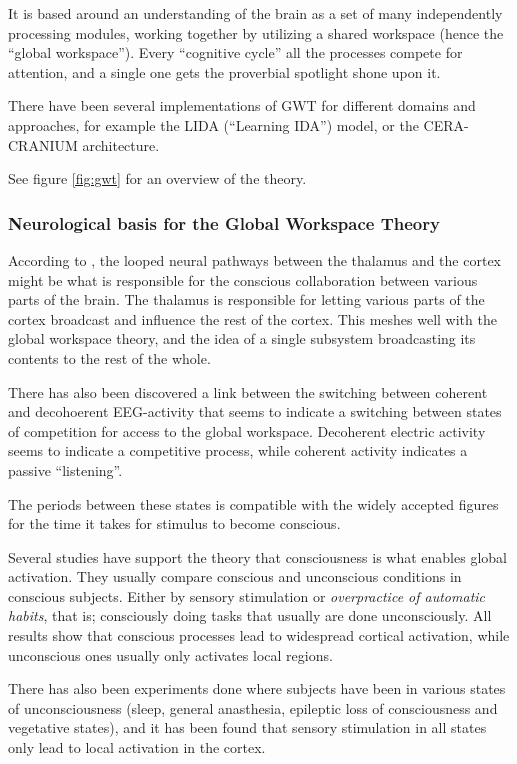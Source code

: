 It is based around an understanding of the brain as a set of many independently processing modules, working together by utilizing a shared workspace (hence the ``global workspace''). Every ``cognitive cycle'' all the processes compete for attention, and a single one gets the proverbial spotlight shone upon it.\cite{baars2005gwt}

There have been several implementations of GWT for different domains and approaches, for example the LIDA (``Learning IDA'') model\cite{franklin2007lida}, or the CERA-CRANIUM architecture\cite{arrabales2009ceracranium}.

See figure \ref{fig:gwt} for an overview of the theory.

\subsubsection{Neurological basis for the Global Workspace Theory}
According to \cite{llinas1998neuronal}, the looped neural pathways between the thalamus and the cortex might be what is responsible for the conscious collaboration between various parts of the brain. The thalamus is responsible for letting various parts of the cortex broadcast and influence the rest of the cortex. This meshes well with the global workspace theory, and the idea of a single subsystem broadcasting its contents to the rest of the whole.

There has also been discovered a link between the switching between coherent and decohoerent EEG-activity that seems to indicate a switching between states of competition for access to the global workspace. Decoherent electric activity seems to indicate a competitive process, while coherent activity indicates a passive ``listening''.\cite{freeman2003neurobiological}

The periods between these states is compatible with the widely accepted figures for the time it takes for stimulus to become conscious.\cite{shanahan2005applying}

Several studies have support the theory that consciousness is what enables global activation. They usually compare conscious and unconscious conditions in conscious subjects. Either by sensory stimulation or {\em overpractice of automatic habits}, that is; consciously doing tasks that usually are done unconsciously. All results show that conscious processes lead to widespread cortical activation, while unconscious ones usually only activates local regions.\cite{baars2003brain}

There has also been experiments done where subjects have been in various states of unconsciousness (sleep, general anasthesia, epileptic loss of consciousness and vegetative states), and it has been found that sensory stimulation in all states only lead to local activation in the cortex.\cite{shanahan2005applying}

